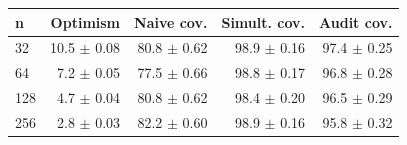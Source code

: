 \begin{tabular}{lrrrr}
\toprule
n & Optimism & Naive cov. & Simult. cov. & Audit cov. \\
\midrule
32 & 10.5 $\pm$ 0.08 & 80.8 $\pm$ 0.62 & 98.9 $\pm$ 0.16 & 97.4 $\pm$ 0.25 \\
64 & 7.2 $\pm$ 0.05 & 77.5 $\pm$ 0.66 & 98.8 $\pm$ 0.17 & 96.8 $\pm$ 0.28 \\
128 & 4.7 $\pm$ 0.04 & 80.8 $\pm$ 0.62 & 98.4 $\pm$ 0.20 & 96.5 $\pm$ 0.29 \\
256 & 2.8 $\pm$ 0.03 & 82.2 $\pm$ 0.60 & 98.9 $\pm$ 0.16 & 95.8 $\pm$ 0.32 \\
\bottomrule
\end{tabular}
